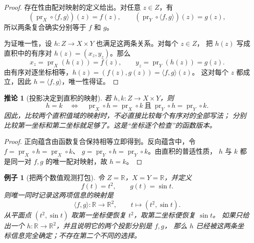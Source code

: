 \documentclass[UTF8,fontset=none,a4paper,11pt]{ctexart}
\theoremstyle{foundation-definition}
\theoremstyle{foundation-theorem}
\theoremstyle{foundation-proposition}
\theoremstyle{foundation-example}
\newtheorem{example}[definition]{例子}
\theoremstyle{foundation-remark}
\theoremstyle{foundation-theorem}
\newtheorem{corollary}[definition]{推论}
\begin{document}
\begin{proof}
存在性由配对映射的定义给出。对任意 \(z\in Z\)，有
\[
 (\operatorname{pr}_X\circ\langle f,g\rangle)(z)=f(z),
 \qquad
 (\operatorname{pr}_Y\circ\langle f,g\rangle)(z)=g(z),
\]
所以两条复合确实分别等于 \(f\) 和 \(g\)。

为证唯一性，设 \(h:Z\to X\times Y\) 也满足这两条关系。对每个 \(z\in Z\)，
把 \(h(z)\) 写成直积中的有序对 \(h(z)=(x_z,y_z)\)。那么
\[
 x_z=\operatorname{pr}_X(h(z))=f(z),
 \qquad
 y_z=\operatorname{pr}_Y(h(z))=g(z).
\]
由有序对逐坐标相等，\(h(z)=(f(z),g(z))=\langle f,g\rangle(z)\)。
这对每个 \(z\) 都成立，因此 \(h=\langle f,g\rangle\)，唯一性得证。
\end{proof}

\begin{corollary}[投影决定到直积的映射]\label{cor:cartesian-product-map-equality}
若 \(h,k:Z\to X\times Y\)，则
\[
 h=k
\quad\Longleftrightarrow\quad
 \operatorname{pr}_X\circ h=\operatorname{pr}_X\circ k
 \ \text{且}\
 \operatorname{pr}_Y\circ h=\operatorname{pr}_Y\circ k.
\]
因此，比较两个直积值域的映射时，不必直接比较每个有序对的全部写法；
分别比较第一坐标和第二坐标就足够了。这是“坐标逐个检查”的函数版本。
\end{corollary}

\begin{proof}
正向蕴含由函数复合保持相等立即得到。反向蕴含中，令
\(f=\operatorname{pr}_X\circ h=\operatorname{pr}_X\circ k\)、
\(g=\operatorname{pr}_Y\circ h=\operatorname{pr}_Y\circ k\)。由直积的普适性质，
\(h\) 与 \(k\) 都是同一对 \(f,g\) 的唯一配对映射，故 \(h=k\)。
\end{proof}

\begin{example}[把两个数值观测打包]
令 \(Z=\mathbb R\)，\(X=Y=\mathbb R\)，并定义
\[
 f(t)=t^2,\qquad g(t)=\sin t.
\]
则唯一同时记录这两项信息的映射是
\[
 \langle f,g\rangle:\mathbb R\longrightarrow\mathbb R^2,
 \qquad t\longmapsto(t^2,\sin t).
\]
从平面点 \((t^2,\sin t)\) 取第一坐标便恢复 \(t^2\)，取第二坐标便恢复 \(\sin t\)。
如果只给出一个 \(h:\mathbb R\to\mathbb R^2\)，并且说明它的两个投影分别是 \(f,g\)，
那么 \(h\) 已经被这两条坐标信息完全确定；不存在第二个不同的选择。
\end{example}
\end{document}
